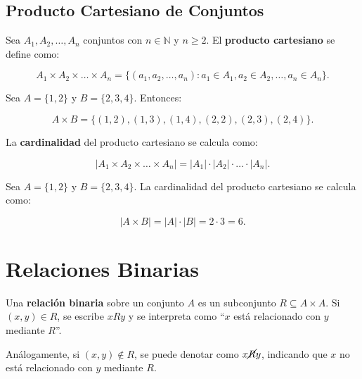 \documentclass[a4paper,12pt]{article}
\begin{document}
\subsection{Producto Cartesiano de Conjuntos}

\begin{procedimiento}[title=Producto Cartesiano]
Sea \(A_1, A_2, \dots, A_n\) conjuntos con \(n \in \mathbb{N}\) y \(n \ge 2\).  
El \textbf{producto cartesiano} se define como:

\[
A_1 \times A_2 \times \dots \times A_n = 
\{ (a_1, a_2, \dots, a_n) : a_1 \in A_1, a_2 \in A_2, \dots, a_n \in A_n \}.
\]
\end{procedimiento}

\begin{ejemplo}
Sea \(A = \{1,2\}\) y \(B = \{2,3,4\}\). Entonces:

\[
A \times B = \{ (1,2), (1,3), (1,4), (2,2), (2,3), (2,4) \}.
\]
\end{ejemplo}

\begin{procedimiento}[title=Cardinal del Producto Cartesiano]
La \textbf{cardinalidad} del producto cartesiano se calcula como:

\[
|A_1 \times A_2 \times \dots \times A_n| = |A_1| \cdot |A_2| \cdot \dots \cdot |A_n|.
\]
\end{procedimiento}

\begin{ejemplo}
Sea \(A = \{1,2\}\) y \(B = \{2,3,4\}\).  
La cardinalidad del producto cartesiano se calcula como:

\[
|A \times B| = |A| \cdot |B| = 2 \cdot 3 = 6.
\]
\end{ejemplo}

\section{Relaciones Binarias}

\begin{procedimiento}[title=Definición de Relación Binaria]
Una \textbf{relación binaria} sobre un conjunto \(A\) es un subconjunto \(R \subseteq A \times A\).  
Si \((x,y) \in R\), se escribe \(xRy\) y se interpreta como “\(x\) está relacionado con \(y\) mediante \(R\)”.  

Análogamente, si \((x,y) \notin R\), se puede denotar como \(x \cancel{R} y\), indicando que \(x\) no está relacionado con \(y\) mediante \(R\).
\end{procedimiento}
\end{document}
